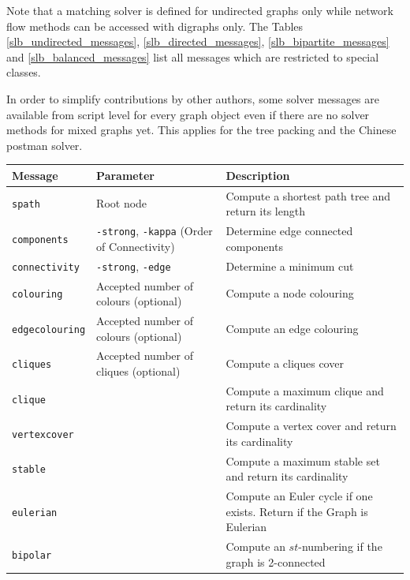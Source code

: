 \documentclass[a4paper,11pt,twoside]{book}
\begin{document}
Note that a matching solver is defined for undirected graphs only while network
flow methods can be accessed with digraphs only. The Tables
\ref{slb_undirected_messages}, \ref{slb_directed_messages},
\ref{slb_bipartite_messages} and \ref{slb_balanced_messages} list all messages
which are restricted to special classes.

In order to simplify contributions by other authors, some solver messages are
available from script level for every graph object even if there are no solver
methods for mixed graphs yet. This applies for the tree packing and the Chinese
postman solver.

\bigskip
\begin{center}
\begin{tabular}{|p{3cm}|p{8cm}|p{12.5cm}|}
\hline
{\bf Message}          & {\bf Parameter} & {\bf Description} \\
\hline
\hline
\verb/spath/            & Root node
                        & Compute a shortest path tree and return its length \\
\hline
\verb/components/       & \verb/-strong/, \verb/-kappa/ (Order of Connectivity)
                        & Determine edge connected components \\
\hline
\verb/connectivity/     & \verb/-strong/, \verb/-edge/
                        & Determine a minimum cut \\
\hline
\verb/colouring/        & Accepted number of colours (optional)
                        & Compute a node colouring \\
\hline
\verb/edgecolouring/    & Accepted number of colours (optional)
                        & Compute an edge colouring \\
\hline
\verb/cliques/          & Accepted number of cliques (optional)
                        & Compute a cliques cover \\
\hline
\verb/clique/           &
                        & Compute a maximum clique and return its cardinality \\
\hline
\verb/vertexcover/      &
                        & Compute a vertex cover and return its cardinality \\
\hline
\verb/stable/           &
                        & Compute a maximum stable set and return its cardinality \\
\hline
\verb/eulerian/         & & Compute an Euler cycle if one exists. Return if the Graph
                          is Eulerian \\
\hline
\verb/bipolar/          &
                        & Compute an $st$-numbering if the graph is 2-connected \\

\end{tabular}
\end{center}
\end{document}
